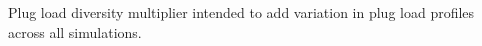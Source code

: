 Plug load diversity multiplier intended to add variation in plug load profiles across all simulations.
